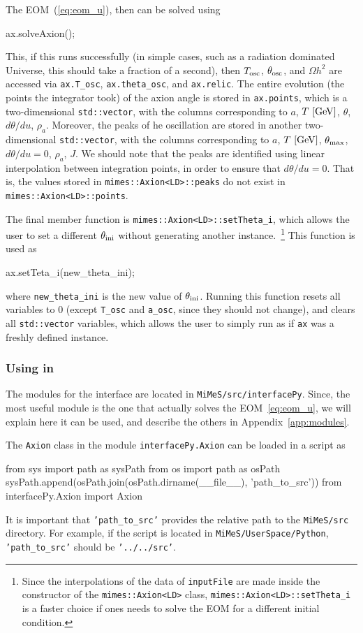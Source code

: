 \documentclass[11pt,a4paper]{article}
\begin{document}
The EOM~(\ref{eq:eom_u}), then can be solved using 
%
\begin{cpp}
	ax.solveAxion();
\end{cpp}
%
This, if this runs successfully (in simple cases, such as a radiation dominated Universe, this should take a fraction of a second), then  $T_{\rm osc}{}$, $\theta_{\rm osc}{}$, and $\Omega h^2$ are accessed via {\tt ax.T\_osc}, {\tt ax.theta\_osc}, and {\tt ax.relic}. The entire evolution (the points the integrator took) of the axion angle is stored in {\tt ax.points}, which is a two-dimensional {\tt std::vector}, with the columns corresponding to  $a$, $T~[{\rm GeV}]$, 
$\theta$, $d\theta/du$, $\rho_a$. Moreover, the peaks of he oscillation are stored in another two-dimensional {\tt std::vector}, with the columns corresponding to $a$, $T~[{\rm GeV}]$, $\theta_{\rm max}{}$, $d\theta/du=0$, $\rho_a$, $J$. We should note that the peaks are identified using linear interpolation between integration points, in order to ensure that $d\theta/du = 0$. That is, the values stored in {\tt mimes::Axion<LD>::peaks} do not exist in {\tt mimes::Axion<LD>::points}.

The final member function is {\tt mimes::Axion<LD>::setTheta\_i}, which allows the user to set a different $\theta_{\rm ini}{}$ without generating another instance.~\footnote{Since the interpolations of the data of {\tt inputFile} are made inside the constructor of the {\tt mimes::Axion<LD>} class, {\tt mimes::Axion<LD>::setTheta\_i} is a faster choice if ones needs to solve the EOM for a different initial condition.} This function is used as    
%
\begin{cpp}
	ax.setTeta_i(new_theta_ini);
\end{cpp}
%
where {\tt new\_theta\_ini} is the new value of $\theta_{\rm ini}{}$. Running this function resets all variables to $0$ (except {\tt T\_osc} and {\tt a\_osc}, since they should not change), and clears all {\tt std::vector} variables, which allows the user to simply run  as if {\tt ax} was a freshly defined instance.  

\subsubsection{Using \mimes in \PY} The modules for the \PY interface are located in {\tt MiMeS/src/interfacePy}. Since, the most useful module is the one that actually solves the EOM~\ref{eq:eom_u}, we will explain here it can be used, and describe the others in Appendix~\ref{app:modules}.

The {\tt Axion} class in the module {\tt interfacePy.Axion} can be loaded in a \PY script as 
%
\begin{py}
	from sys import path as sysPath
	from os import path as osPath
	sysPath.append(osPath.join(osPath.dirname(__file__), 'path_to_src'))
	from interfacePy.Axion import Axion
\end{py}
%
It is important that \texttt{'path_to_src'} provides the relative path to the {\tt MiMeS/src} directory. For example, if the script is located in {\tt MiMeS/UserSpace/Python}, \texttt{'path_to_src'} should be \texttt{'../../src'}.
\end{document}
